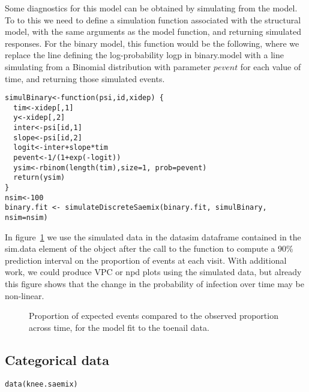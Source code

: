 
Some diagnostics for this model can be obtained by simulating from the model. To to this we need to define a simulation function associated with the structural model, with the same arguments as the model function, and returning simulated responses. For the binary model, this function would be the following, where we replace the line defining the log-probability {\sf logp} in {\sf binary.model} with a line simulating from a Binomial distribution with parameter $pevent$ for each value of time, and returning those simulated events.
\begin{verbatim}
simulBinary<-function(psi,id,xidep) {
  tim<-xidep[,1]
  y<-xidep[,2]
  inter<-psi[id,1]
  slope<-psi[id,2]
  logit<-inter+slope*tim
  pevent<-1/(1+exp(-logit))
  ysim<-rbinom(length(tim),size=1, prob=pevent)
  return(ysim)
}
nsim<-100
binary.fit <- simulateDiscreteSaemix(binary.fit, simulBinary, nsim=nsim)
\end{verbatim}

In figure~\ref{fig:toenailPropVPC} we use the simulated data in the {\sf datasim} dataframe contained in the {\sf sim.data} element of the object after the call to the function to compute a 90\% prediction interval on the proportion of events at each visit. With additional work, we could produce VPC or npd plots using the simulated data, but already this figure shows that the change in the probability of infection over time may be non-linear.

\begin{figure}[!h]
\begin{center}
\end{center}
\par \kern -0.5cm
\caption{Proportion of expected events compared to the observed proportion across time, for the model fit to the toenail data.} \label{fig:toenailPropVPC}
\end{figure}

\clearpage
\newpage

\subsection{Categorical data} \label{sec:kneeCat}

\begin{verbatim}
data(knee.saemix)
\end{verbatim}

\begin{verbatim}

\end{verbatim}


